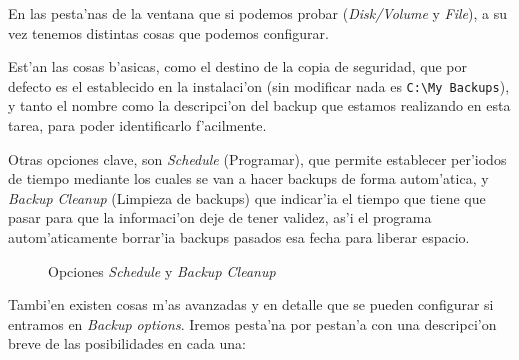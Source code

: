 \documentclass[11pt]{article}
\begin{document}
	En las pesta'nas de la ventana que si podemos probar (\textit{Disk/Volume} y \textit{File}), a su vez tenemos distintas cosas que podemos configurar. 
	
	Est'an las cosas b'asicas, como el destino de la copia de seguridad, que por defecto es el establecido en la instalaci'on (sin modificar nada es \texttt{C:\textbackslash{}My Backups}), y tanto el nombre como la descripci'on del backup que estamos realizando en esta tarea, para poder identificarlo f'acilmente.
	
	Otras opciones clave, son \textit{Schedule} (Programar), que permite establecer per'iodos de tiempo mediante los cuales se van a hacer backups de forma autom'atica, y \textit{Backup Cleanup} (Limpieza de backups) que indicar'ia el tiempo que tiene que pasar para que la informaci'on deje de tener validez, as'i el programa autom'aticamente borrar'ia backups pasados esa fecha para liberar espacio.
	
	
	\begin{figure}
		\centering
		\hfill
		\vspace{7pt}
		\caption{Opciones \textit{Schedule} y \textit{Backup Cleanup}}
	\end{figure}
	
	Tambi'en existen cosas m'as avanzadas y en detalle que se pueden configurar si entramos en \textit{Backup options}. Iremos pesta'na por pestan'a con una descripci'on breve de las posibilidades en cada una:
	
\end{document}
